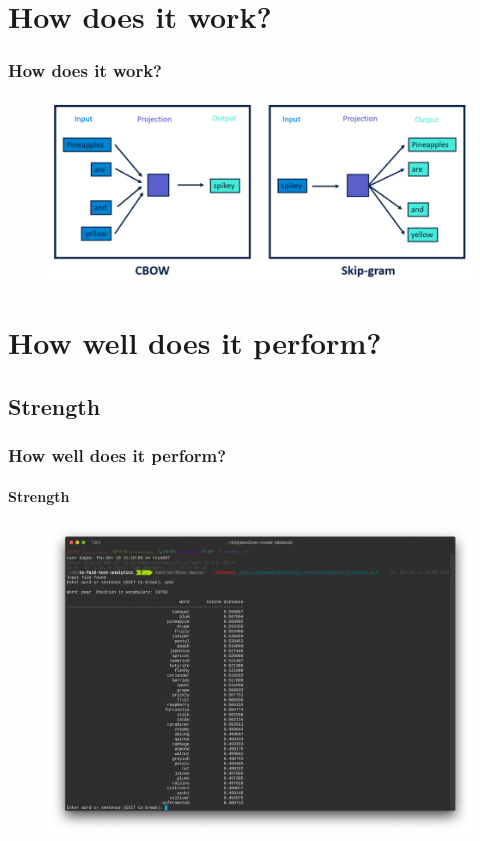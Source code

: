 \documentclass{beamer}
\begin{document}
\section{How does it work?}
\begin{frame}
    \frametitle{How does it work?}
    \begin{figure}
        \includegraphics[scale=0.5]{how-word2vec-works}
    \end{figure}
\end{frame}

\section{How well does it perform?}
\subsection{Strength}
\begin{frame}
    \frametitle{How well does it perform?}
    \framesubtitle{Strength}
    \begin{figure}
        \includegraphics[scale=0.45]{strength}
    \end{figure}
\end{frame}
\end{document}

